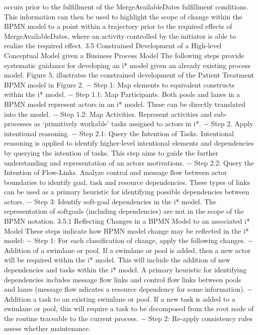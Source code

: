 occurs prior to the fulfillment of the MergeAvailableDates fulfillment conditions.
This information can then be used to highlight the scope of change within the BPMN
model to a point within a trajectory prior to the required effects of MergeAvailableDates, where an activity controlled by the initiator is able to realize the required effect.
3.5 Constrained Development of a High-level Conceptual Model given a
Business Process Model
The following steps provide systematic guidance for developing an i* model given an
already existing process model. Figure 5, illustrates the constrained development of
the Patient Treatment BPMN model in Figure 2.
− Step 1: Map elements to equivalent constructs within the i* model.
− Step 1.1: Map Participants. Both pools and lanes in a BPMN model represent
actors in an i* model. These can be directly translated into the model.
− Step 1.2: Map Activities. Represent activities and sub-processes as ‘primitively
workable’ tasks assigned to actors in i*.
− Step 2. Apply intentional reasoning.
− Step 2.1: Query the Intention of Tasks. Intentional reasoning is applied to identify higher-level intentional elements and dependencies by querying the intention of tasks. This step aims to guide the further understanding and representation of an actors motivations.
− Step 2.2: Query the Intention of Flow-Links. Analyze control and message
flow between actor boundaries to identify goal, task and resource dependencies.
These types of links can be used as a primary heuristic for identifying possible
dependencies between actors.
− Step 3: Identify soft-goal dependencies in the i* model. The representation of softgoals (including dependencies) are not in the scope of the BPMN notation.
3.5.1 Reflecting Changes in a BPMN Model to an associated i* Model
These steps indicate how BPMN model change may be reflected in the i* model:
− Step 1: For each classification of change, apply the following changes.
− Addition of a swimlane or pool. If a swimlane or pool is added, then a new actor will be required within the i* model. This will include the addition of new
dependencies and tasks within the i* model. A primary heuristic for identifying
dependencies includes message flow links and control flow links between pools
and lanes (message flow ndicates a resource dependency for some information).
− Addition a task to an existing swimlane or pool. If a new task is added to a
swimlane or pool, this will require a task to be decomposed from the root node
of the routine traceable to the current process.
− Step 2: Re-apply consistency rules assess whether maintenance.
